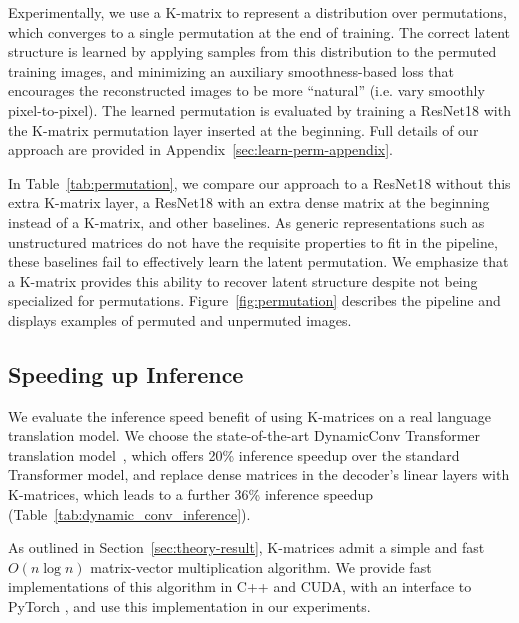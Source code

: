 Experimentally, we use a K-matrix to represent a distribution over permutations, which converges to a single permutation at the end of training. The correct latent structure is learned by applying samples from this distribution to the permuted training images, and minimizing an auxiliary smoothness-based loss that encourages the reconstructed images to be more ``natural'' (i.e. vary smoothly pixel-to-pixel). The learned permutation is evaluated by training a ResNet18 with the K-matrix permutation layer inserted at the beginning. Full details of our approach are provided in Appendix~\ref{sec:learn-perm-appendix}.

In Table~\ref{tab:permutation}, we compare our approach to a ResNet18 without this extra K-matrix layer, a ResNet18 with an extra dense matrix at the beginning instead of a K-matrix, and other baselines. As generic representations such as unstructured matrices do not have the requisite properties to fit in the pipeline, these baselines fail to effectively learn the latent permutation. We emphasize that a K-matrix provides this ability to recover latent structure despite not being specialized for permutations.
Figure~\ref{fig:permutation} describes the pipeline and displays examples of permuted and unpermuted images.

\subsection{Speeding up Inference}
\label{sec:inference}

We evaluate the inference speed benefit of using K-matrices on a real language translation model. We choose the state-of-the-art DynamicConv Transformer translation model~\citep{wu2019pay}, which offers 20\% inference speedup over the standard Transformer model, and replace dense matrices in the decoder's linear layers with K-matrices, which leads to a further 36\% inference speedup (Table~\ref{tab:dynamic_conv_inference}).

As outlined in Section~\ref{sec:theory-result}, K-matrices admit a simple and fast $O(n \log n)$ matrix-vector multiplication algorithm. We provide fast implementations of this algorithm in C++ and CUDA, with an interface to PyTorch \citep{pytorch}, and use this implementation in our experiments.

